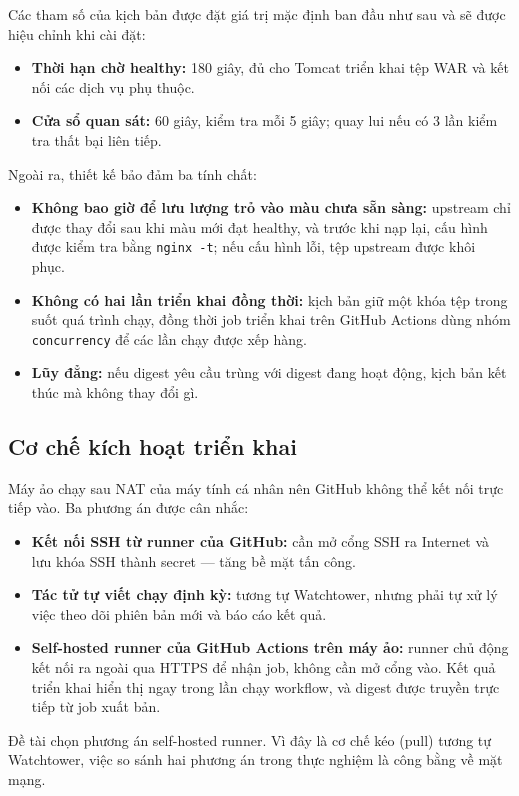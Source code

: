 \documentclass[12pt,a4paper,oneside]{extreport}
\begin{document}
Các tham số của kịch bản được đặt giá trị mặc định ban đầu như sau và sẽ được
hiệu chỉnh khi cài đặt:
\begin{itemize}
  \item \textbf{Thời hạn chờ healthy:} 180 giây, đủ cho Tomcat triển khai tệp WAR
  và kết nối các dịch vụ phụ thuộc.
  \item \textbf{Cửa sổ quan sát:} 60 giây, kiểm tra mỗi 5 giây; quay lui nếu có 3
  lần kiểm tra thất bại liên tiếp.
\end{itemize}

Ngoài ra, thiết kế bảo đảm ba tính chất:
\begin{itemize}
  \item \textbf{Không bao giờ để lưu lượng trỏ vào màu chưa sẵn sàng:} upstream
  chỉ được thay đổi sau khi màu mới đạt healthy, và trước khi nạp lại, cấu hình
  được kiểm tra bằng \texttt{nginx -t}; nếu cấu hình lỗi, tệp upstream được khôi
  phục.
  \item \textbf{Không có hai lần triển khai đồng thời:} kịch bản giữ một khóa tệp
  trong suốt quá trình chạy, đồng thời job triển khai trên GitHub Actions dùng
  nhóm \texttt{concurrency} để các lần chạy được xếp hàng.
  \item \textbf{Lũy đẳng:} nếu digest yêu cầu trùng với digest đang hoạt động,
  kịch bản kết thúc mà không thay đổi gì.
\end{itemize}

\subsection{Cơ chế kích hoạt triển khai}
Máy ảo chạy sau NAT của máy tính cá nhân nên GitHub không thể kết nối trực tiếp
vào. Ba phương án được cân nhắc:
\begin{itemize}
  \item \textbf{Kết nối SSH từ runner của GitHub:} cần mở cổng SSH ra Internet
  và lưu khóa SSH thành secret --- tăng bề mặt tấn công.
  \item \textbf{Tác tử tự viết chạy định kỳ:} tương tự Watchtower, nhưng phải tự
  xử lý việc theo dõi phiên bản mới và báo cáo kết quả.
  \item \textbf{Self-hosted runner của GitHub Actions trên máy ảo:} runner chủ
  động kết nối ra ngoài qua HTTPS để nhận job, không cần mở cổng vào. Kết quả
  triển khai hiển thị ngay trong lần chạy workflow, và digest được truyền trực
  tiếp từ job xuất bản.
\end{itemize}
Đề tài chọn phương án self-hosted runner. Vì đây là cơ chế kéo (pull) tương tự
Watchtower, việc so sánh hai phương án trong thực nghiệm là công bằng về mặt
mạng.
\end{document}

